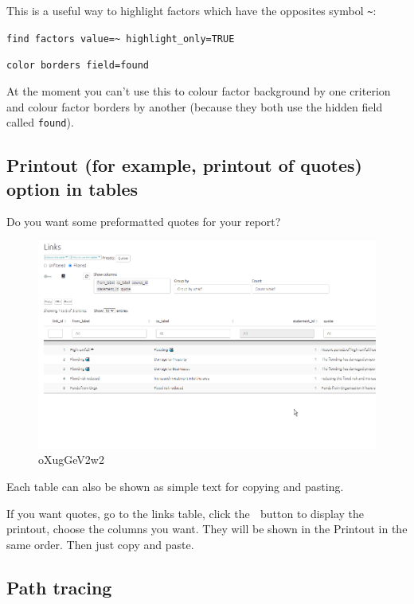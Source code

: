 \documentclass[
]{book}
\begin{document}
This is a useful way to highlight factors which have the opposites symbol \texttt{\textasciitilde{}}:

\texttt{find\ factors\ value=\textasciitilde{}\ highlight\_only=TRUE}

\texttt{color\ borders\ field=found}

At the moment you can't use this to colour factor background by one criterion and colour factor borders by another (because they both use the hidden field called \texttt{found}).

\hypertarget{printout-for-example-printout-of-quotes-option-in-tables}{%
\subsection{Printout (for example, printout of quotes) option in tables}\label{printout-for-example-printout-of-quotes-option-in-tables}}

Do you want some preformatted quotes for your report?

\begin{figure}
\centering
\includegraphics{_assets/oXugGeV2w2.gif}
\caption{oXugGeV2w2}
\end{figure}

Each table can also be shown as simple text for copying and pasting.

If you want quotes, go to the links table, click the 📘 button to display the printout, choose the columns you want. They will be shown in the Printout in the same order. Then just copy and paste.

\hypertarget{path-tracing}{%
\subsection{Path tracing}\label{path-tracing}}
\end{document}
